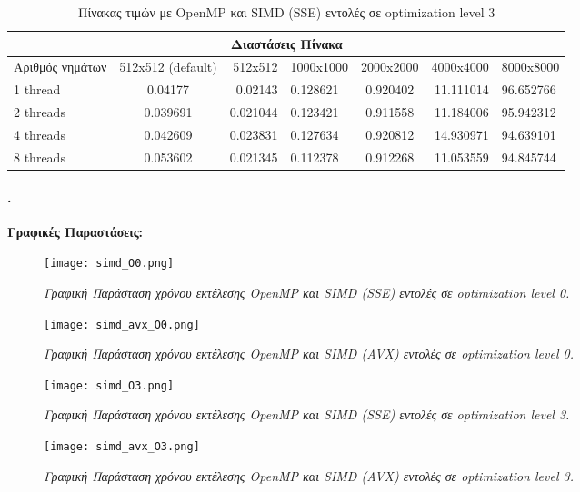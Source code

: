 \documentclass[greek,booktabs,8pt,flagBlueCMYK]{report}
\begin{document}
\begin{table}[H]
\begin{center}
\label{tab:11} 
\begin{tabular}{| l | c | r | l | c | r | l |}
  \hline
  \multicolumn{7}{|c|}{Διαστάσεις Πίνακα} \\ \hline
  Αριθμός νημάτων & 512x512 (default) & 512x512 & 1000x1000 & 2000x2000 & 4000x4000 & 8000x8000\\ \hline 
  1 thread   & 0.04177 & 0.02143 & 0.128621 & 0.920402 & 11.111014 & 96.652766 \\ \hline
  2 threads  & 0.039691 & 0.021044 & 0.123421 & 0.911558 & 11.184006 & 95.942312 \\ \hline
  4 threads  & 0.042609 & 0.023831 & 0.127634 & 0.920812 & 14.930971 & 94.639101 \\ \hline
  8 threads  & 0.053602 & 0.021345 & 0.112378 & 0.912268 & 11.053559 & 94.845744 \\ \hline
\end{tabular}
\caption {Πίνακας τιμών με OpenMP και SIMD (SSE) εντολές σε optimization level 3}
\end{center}
\end{table}

\paragraph{.} \textbf{Γραφικές Παραστάσεις:}\newline

\begin{figure}[ht]
\centering
\label{fig:SIMD}
\texttt{[image: simd\_O0.png]}
\caption{\textit{Γραφική Παράσταση χρόνου εκτέλεσης OpenMP και SIMD (SSE) εντολές σε optimization level 0.}}
\end{figure}

\begin{figure}[ht]
\centering
\label{fig:SIMDAVX}
\texttt{[image: simd\_avx\_O0.png]}
\caption{\textit{Γραφική Παράσταση χρόνου εκτέλεσης OpenMP και SIMD (AVX) εντολές σε optimization level 0.}}
\end{figure}

\begin{figure}[ht]
\centering
\label{fig:SIMDO3}
\texttt{[image: simd\_O3.png]}
\caption{\textit{Γραφική Παράσταση χρόνου εκτέλεσης OpenMP και SIMD (SSE) εντολές σε optimization level 3.}}
\end{figure}

\begin{figure}[ht]
\centering
\label{fig:SIMDO3}
\texttt{[image: simd\_avx\_O3.png]}
\caption{\textit{Γραφική Παράσταση χρόνου εκτέλεσης OpenMP και SIMD (AVX) εντολές σε optimization level 3.}}
\end{figure}
\end{document}

